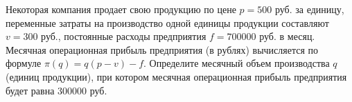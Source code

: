 \begin{ex}
	\begin{condition}
		Некоторая компания продает свою продукцию по цене \(  p=500  \) руб. за единицу, переменные затраты на производство одной единицы продукции составляют  \( v=300 \) руб., постоянные расходы предприятия \( f=700000 \) руб. в месяц. Месячная операционная прибыль предприятия (в рублях) вычисляется по формуле  \( \pi(q)=q(p-v)-f \). Определите месячный объем производства \(  q \) (единиц продукции), при котором месячная операционная прибыль предприятия будет равна \( 300000 \) руб.
	\end{condition}
\end{ex}